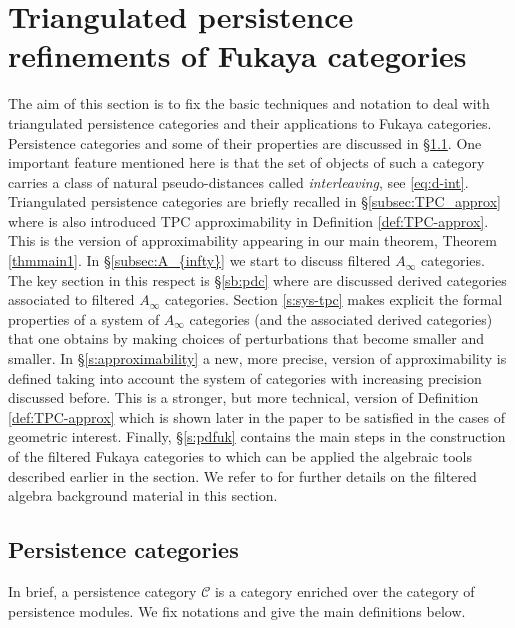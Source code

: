 
\section{Triangulated persistence refinements of Fukaya
  categories} \label{sec:alg1}
The aim of this section is to fix the basic techniques and notation to
deal with triangulated persistence categories and their applications
to Fukaya categories. Persistence categories and some of their
properties are discussed in \S\ref{subsec:PC}. One important feature
mentioned here is that the set of objects of such a category carries a
class of natural pseudo-distances called {\em interleaving}, see
\eqref{eq:d-int}. Triangulated persistence categories are briefly
recalled in \S\ref{subsec:TPC_approx} where is also introduced TPC
approximability in Definition \ref{def:TPC-approx}. This is the
version of approximability appearing in our main theorem, Theorem
\ref{thmmain1}. In \S\ref{subsec:A_{infty}} we start to discuss
filtered $A_{\infty}$ categories. The key section in this respect is
\S\ref{sb:pdc} where are discussed derived categories associated to
filtered $A_{\infty}$ categories. Section \ref{s:sys-tpc} makes
explicit the formal properties of a system of $A_{\infty}$ categories
(and the associated derived categories) that one obtains by making
choices of perturbations that become smaller and smaller. In
\S\ref{s:approximability} a new, more precise, version of
approximability is defined taking into account the system of
categories with increasing precision discussed before.  This is a
stronger, but more technical, version of Definition
\ref{def:TPC-approx} which is shown later in the paper to be satisfied
in the cases of geometric interest. Finally, \S\ref{s:pdfuk} contains
the main steps in the construction of the filtered Fukaya categories
to which can be applied the algebraic tools described earlier in the
section. We refer to \cite{BCZ:tpc} for further details on the
filtered algebra background material in this section.


\subsection{Persistence categories}\label{subsec:PC}
In brief, a persistence category $\mathscr{C}$ is a category enriched
over the category of persistence modules.  We fix notations and give the main
definitions below.
